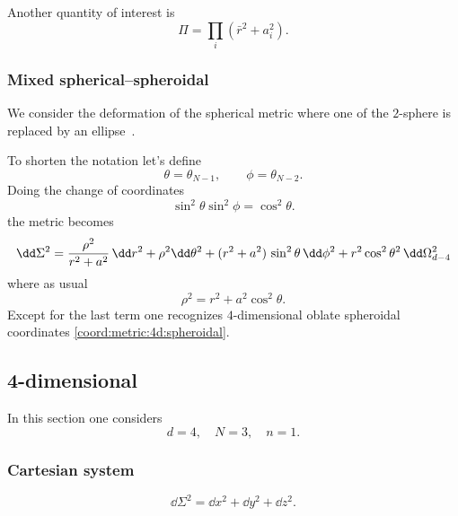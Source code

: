 Another quantity of interest is
\begin{equation}
	\label{coord:eq:flat-d:spheroidal:Pi}
	\Pi = \prod_i (\bar r^2 + a_i^2).
\end{equation} 


\subsubsection{Mixed spherical–spheroidal}
\label{app:coord:general-d:oblate-spherical}

We consider the deformation of the spherical metric where one of the $2$-sphere is replaced by an ellipse~\cite[sec.~3]{Aliev:2006:RotatingBlackHoles}.

To shorten the notation let's define
\begin{equation}
	\theta = \theta_{N-1}, \qquad
	\phi = \theta_{N-2}.
\end{equation} 
Doing the change of coordinates
\begin{equation}
	\sin^2 \theta \sin^2 \phi = \cos^2 \theta.
\end{equation}
the metric becomes
\begin{equation}
	\dd \Sigma^2 = \frac{\rho^2}{r^2 + a^2}\, \dd r^2
		+ \rho^2 \dd\theta^2 \\
		+ (r^2 + a^2)\, \sin^2 \theta\, \dd\phi^2
		+ r^2 \cos^2 \theta^2\, \dd\Omega_{d-4}^2
\end{equation} 
where as usual
\begin{equation}
	\rho^2 = r^2 + a^2 \cos^2 \theta.
\end{equation} 
Except for the last term one recognizes $4$-dimensional oblate spheroidal coordinates \eqref{coord:metric:4d:spheroidal}.


\subsection{4-dimensional}
\label{app:coord:4d}


In this section one considers
\begin{equation}
	d = 4, \quad
	N = 3, \quad
	n = 1.
\end{equation} 


\subsubsection{Cartesian system}

\begin{equation}
	\dd \Sigma^2 = \dd x^2 + \dd y^2 + \dd z^2.
\end{equation} 


